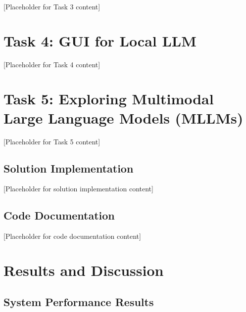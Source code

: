 \documentclass[12pt,a4paper]{article}
\begin{document}
[Placeholder for Task 3 content]

\section{Task 4: GUI for Local LLM}

[Placeholder for Task 4 content]

\section{Task 5: Exploring Multimodal Large Language Models (MLLMs)}

[Placeholder for Task 5 content]


\subsection{Solution Implementation}


[Placeholder for solution implementation content]

\subsection{Code Documentation}


[Placeholder for code documentation content]

\section{Results and Discussion}


\subsection{System Performance Results}

\end{document}
